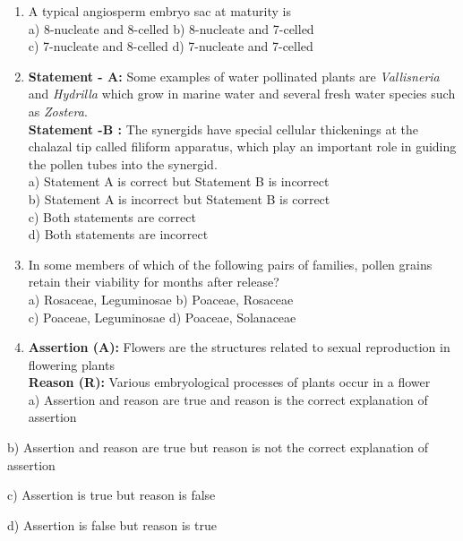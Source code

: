 \begin{enumerate}
\def\labelenumi{\arabic{enumi}.}
\setcounter{enumi}{147}
\item
  A typical angiosperm embryo sac at maturity is\\
  a) 8-nucleate and 8-celled b) 8-nucleate and 7-celled\\
  c) 7-nucleate and 8-celled d) 7-nucleate and 7-celled
\item
  \textbf{Statement - A:} Some examples of water pollinated plants are
  \emph{Vallisneria} and \emph{Hydrilla} which grow in marine water and
  several fresh water species such as \emph{Zostera}.\\
  \textbf{Statement -B :} The synergids have special cellular
  thickenings at the chalazal tip called filiform apparatus, which play
  an important role in guiding the pollen tubes into the synergid.\\
  a) Statement A is correct but Statement B is incorrect\\
  b) Statement A is incorrect but Statement B is correct\\
  c) Both statements are correct\\
  d) Both statements are incorrect
\item
  In some members of which of the following pairs of families, pollen
  grains retain their viability for months after release?\\
  a) Rosaceae, Leguminosae b) Poaceae, Rosaceae\\
  c) Poaceae, Leguminosae d) Poaceae, Solanaceae
\item
  \textbf{Assertion (A):} Flowers are the structures related to sexual
  reproduction in flowering plants\\
  \textbf{Reason (R):} Various embryological processes of plants occur
  in a flower\\
  a) Assertion and reason are true and reason is the correct explanation
  of assertion
\end{enumerate}

b) Assertion and reason are true but reason is not the correct
explanation of assertion

c) Assertion is true but reason is false

d) Assertion is false but reason is true

